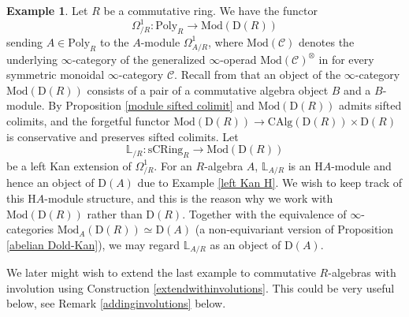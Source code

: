\documentclass[10pt]{amsart}
\theoremstyle{definition}
\newtheorem{exm}[thm]{Example}
\numberwithin{equation}{section}
\renewcommand{\L}{\mathbb{L}}
\newcommand{\cC}{\mathcal{C}}
\newcommand{\rD}{\mathrm{D}}
\newcommand{\rH}{\mathrm{H}}
\newcommand{\CAlg}{\mathrm{CAlg}}
\newcommand{\sCRing}{\mathrm{sCRing}}
\newcommand{\Mod}{\mathrm{Mod}}
\newcommand{\Poly}{\mathrm{Poly}}
\begin{document}
\begin{exm}
\label{left Kan Omega}
Let $R$ be a commutative ring.
We have the functor
\[
\Omega_{/R}^1
\colon
\Poly_R \to \Mod(\rD(R))
\]
sending $A\in \Poly_R$ to the $A$-module $\Omega_{A/R}^1$,
where
$\Mod(\cC)$ denotes the underlying $\infty$-category of the generalized $\infty$-operad $\Mod(\cC)^{\otimes}$ in \cite[Definition 4.5.1.1]{HA} for every symmetric monoidal $\infty$-category $\cC$.
Recall from \cite[Remark 4.2.1.15, Corollary 4.5.1.6]{HA}
that an object of the $\infty$-category $\Mod(\rD(R))$ consists of a pair of a commutative algebra object
$B$ and a $B$-module.
By Proposition \ref{module sifted colimit} and \cite[Corollary 4.2.3.2]{HA}
$\Mod(\rD(R))$ admits sifted colimits, and the forgetful functor $\Mod(\rD(R))\to \CAlg(\rD(R))\times \rD(R)$ is conservative and preserves sifted colimits.
Let
\[
\L_{/R}
\colon
\sCRing_R \to \Mod(\rD(R))
\]
be a 
left Kan extension of $\Omega_{/R}^1$.
For an $R$-algebra $A$,
$\L_{A/R}$ is an $\rH A$-module and hence an object of $\rD(A)$ due to Example \ref{left Kan H}.
We wish to keep track of this $\rH A$-module structure,
and this is the reason why we work with $\Mod(\rD(R))$ rather than $\rD(R)$.
Together with the equivalence of $\infty$-categories $\Mod_A(\rD(R))\simeq \rD(A)$ (a non-equivariant version of Proposition \ref{abelian Dold-Kan}),
we may regard $\L_{A/R}$ as an object of $\rD(A)$.

We later might wish to extend the last example to commutative $R$-algebras with involution using Construction \ref{extendwithinvolutions}. This could be very useful below, see Remark \ref{addinginvolutions} below.
\end{exm}
\end{document}

